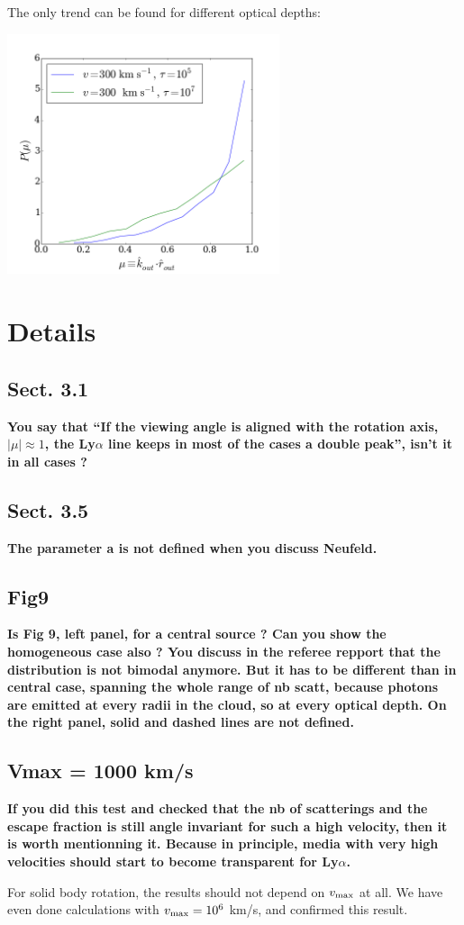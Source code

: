 \documentclass[12pt]{article}
\begin{document}
The only trend can be found for different optical depths:

\begin{center}
\includegraphics[width=0.6\textwidth]{./surface_mu_diff_tau.png}
\end{center}

\section*{Details}

\subsection*{Sect. 3.1}

{\bf You say that “If the viewing angle is aligned with the rotation
  axis, $|\mu| \approx 1$, the Ly$\alpha$ line keeps in most of the
  cases a double peak”, isn’t it in all cases ?} 

\subsection*{Sect. 3.5}
{\bf The parameter a is not defined when you discuss Neufeld.} 

\subsection*{Fig9}

{\bf Is Fig 9, left panel, for a central source ? Can you show the
  homogeneous case also ? You discuss in the referee repport that the
  distribution is not bimodal anymore. But it has to be different than
  in central case, spanning the whole range of nb scatt, because
  photons are emitted at every radii in the cloud, so at every optical
  depth. On the right panel, solid and dashed lines are not defined.} 

\subsection*{Vmax = 1000 km/s}
{\bf If you did this test and checked that the nb of scatterings and
  the escape fraction is still angle invariant for such a high
  velocity, then it is worth mentionning it. Because in principle,
  media with very high velocities should start to become transparent
  for Ly$\alpha$.}  

For solid body rotation, the results should not depend on $v_{\rm
  max}$ at all. We have even done calculations with $v_{\rm max}=10^6$
km/s, and confirmed this result. 
\end{document}
